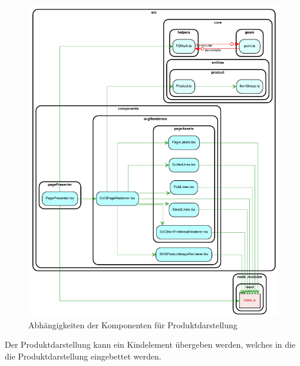 \begin{figure}[H]
    \centering
    \includegraphics{diagrams/Ist-Architektur/page-presenter-analysis.pdf}
    \caption{Abhängigkeiten der Komponenten für Produktdarstellung}
    \label{fig:Produktdarstellung}
\end{figure}

Der Produktdarstellung kann ein Kindelement übergeben werden, welches in die die Produktdarstellung eingebettet werden. 



